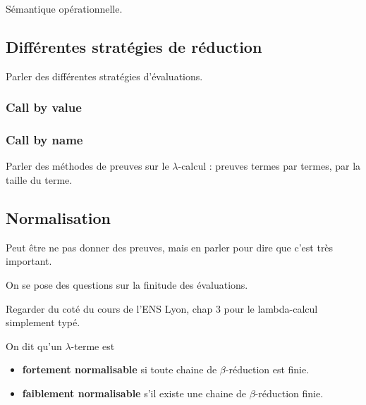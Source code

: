 Sémantique opérationnelle.

\subsection{Différentes stratégies de réduction}

Parler des différentes stratégies d'évaluations.

\subsubsection*{Call by value}
\subsubsection*{Call by name}

Parler des méthodes de preuves sur le $\lambda$-calcul : preuves termes par
termes, par la taille du terme.

\subsection*{Normalisation}

Peut être ne pas donner des preuves, mais en parler pour dire que c'est très important.

On se pose des questions sur la finitude des évaluations.

Regarder du coté du cours de l'ENS Lyon, chap 3 pour le lambda-calcul simplement typé.

\begin{definition}
  On dit qu'un $\lambda$-terme est
  \begin{itemize}
  \item \textbf{fortement normalisable} si
  toute chaine de $\beta$-réduction est finie.
  \item \textbf{faiblement normalisable} s'il existe une chaine de
    $\beta$-réduction finie.
  \end{itemize}
\end{definition}

